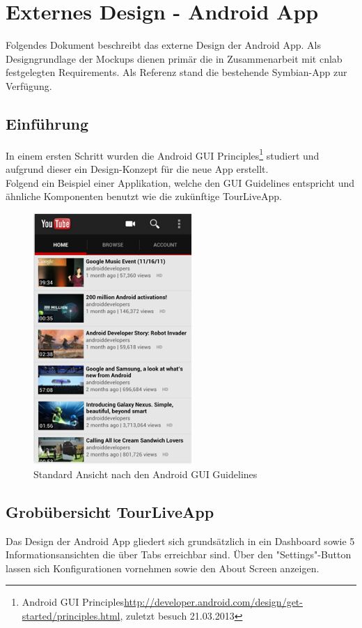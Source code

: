 \section{Externes Design - Android App}
Folgendes Dokument beschreibt das externe Design der Android App. Als Designgrundlage der Mockups dienen primär die in Zusammenarbeit mit cnlab festgelegten Requirements. Als Referenz stand die bestehende Symbian-App zur Verfügung. 

\subsection{Einführung}
In einem ersten Schritt wurden die Android GUI Principles\footnote{Android GUI Principles\url{http://developer.android.com/design/get-started/principles.html}, zuletzt besuch 21.03.2013}  studiert und aufgrund dieser ein Design-Konzept für die neue App erstellt.
\\

Folgend ein Beispiel einer Applikation, welche den GUI Guidelines entspricht und ähnliche Komponenten benutzt wie die zukünftige TourLiveApp.

\begin{figure}[H]
	\centering\includegraphics[width=60mm]{images/android/mockups/androidexample.png} 
	\caption{Standard Ansicht nach den Android GUI Guidelines}
\end{figure}

\subsection{Grobübersicht TourLiveApp}
Das Design der Android App gliedert sich grundsätzlich in ein Dashboard sowie 5 Informationsansichten die über Tabs erreichbar sind. Über den "Settings"-Button lassen sich Konfigurationen vornehmen sowie den About Screen anzeigen.

